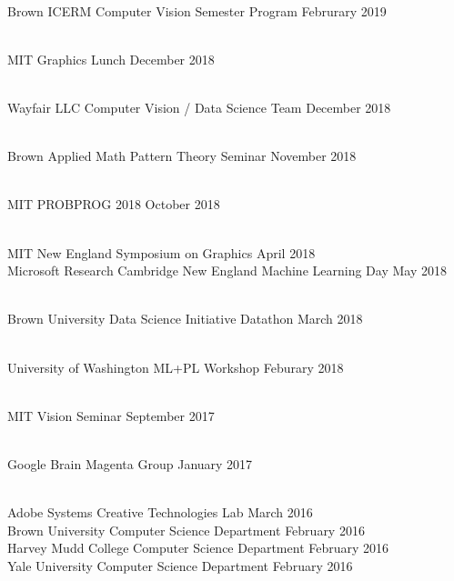 \documentclass[line,margin]{res}
\begin{document}
\begin{resume}
\\
\talk
	{Brown ICERM}
	{Computer Vision Semester Program}
	{Februrary 2019}

\\
\talk
	{MIT}
	{Graphics Lunch}
	{December 2018}

\\
\talk
	{Wayfair LLC}
	{Computer Vision / Data Science Team}
	{December 2018}

\\
\talk
	{Brown Applied Math}
	{Pattern Theory Seminar}
	{November 2018}

\\
\talk
	{MIT}
	{PROBPROG 2018}
	{October 2018}

\\
\talk
	{MIT}
	{New England Symposium on Graphics}
	{April 2018}\\
\talk
	{Microsoft Research Cambridge}
	{New England Machine Learning Day}
	{May 2018}

\\
\talk
	{Brown University Data Science Initiative}
	{Datathon}
	{March 2018}

\\
\talk
	{University of Washington}
	{ML+PL Workshop}
	{Feburary 2018}

\\
\talk
	{MIT}
	{Vision Seminar}
	{September 2017}

\\
\talk
	{Google Brain}
	{Magenta Group}
	{January 2017}

\\
\talk
	{Adobe Systems}
	{Creative Technologies Lab}
	{March 2016}\\
\talk
	{Brown University}
	{Computer Science Department}
	{February 2016}\\
\talk
	{Harvey Mudd College}
	{Computer Science Department}
	{February 2016}\\
\talk
	{Yale University}
	{Computer Science Department}
	{February 2016}



\end{resume}
\end{document}
